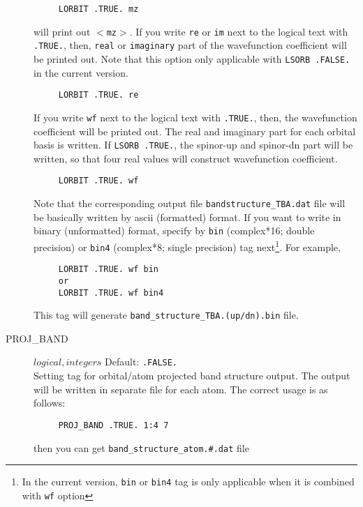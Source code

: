 \documentclass[a4paper,12pt]{scrartcl}
\makeatletter
\def\namedlabel#1#2{\begingroup
    #2%
    \def\@currentlabel{#2}%
    \phantomsection\label{#1}\endgroup
}
\newcommand{\textblue}[1]{\textcolor{blue!85!white}{\texttt{#1}}}
\makeatother
\begin{document}
\begin{description}
    \begin{verbatim}
     LORBIT .TRUE. mz
    \end{verbatim}
    will print out $<$\texttt{mz}$>$.
        If you write \texttt{re} or \texttt{im} next to the logical text with \texttt{.TRUE.}, then, \texttt{real} or \texttt{imaginary} part of the wavefunction coefficient will be printed out. Note that this option only applicable with \texttt{LSORB .FALSE.} in the current version.
    \begin{verbatim}
     LORBIT .TRUE. re
    \end{verbatim}
        If you write \texttt{wf} next to the logical text with \texttt{.TRUE.}, then, the wavefunction coefficient will be printed out. The real and imaginary part for 
        each orbital basis is written. If \texttt{LSORB .TRUE.},
        the spinor-up and spinor-dn part will be written, so that four real values will construct wavefunction coefficient. 
    \begin{verbatim}
     LORBIT .TRUE. wf
    \end{verbatim}

        Note that the corresponding output file \texttt{bandstructure\_TBA.dat} file will be basically 
        written by ascii (formatted) format. If you want to write in binary (unformatted) format,
        specify by \texttt{bin} (complex*16; double precision) or \texttt{bin4} (complex*8; single precision) tag next\footnote{In the current version, \texttt{bin} or \texttt{bin4} tag is only applicable when it is combined with \texttt{wf} option}. For example,

    \begin{verbatim}
     LORBIT .TRUE. wf bin
     or
     LORBIT .TRUE. wf bin4
    \end{verbatim}
    
        This tag will generate \texttt{band\_structure\_TBA.(up/dn).}\textblue{bin} file.
        
    \item[\namedlabel{tag:PROJBAND}{PROJ\_BAND}] $logical, integers$ Default: \texttt{.FALSE.} \\
		Setting tag for orbital/atom projected band structure output. The output will be written in separate file for each atom. The correct usage is as follows: 
    \begin{verbatim}
     PROJ_BAND .TRUE. 1:4 7
    \end{verbatim}
    then you can get \texttt{band\_structure\_atom.\#.dat} file \\
    

\end{description}
\end{document}
